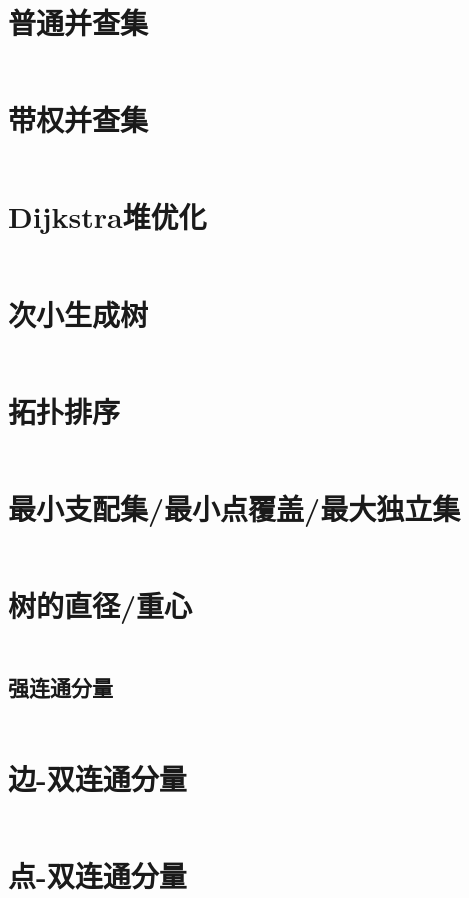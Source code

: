 \documentclass[a4paper,11pt]{article}
\begin{document}
\newpage
\section*{普通并查集}
\inputminted[]{c++}{Template/TreeGraph/UnionSetI.cpp}
\section*{带权并查集}
\inputminted[]{c++}{Template/TreeGraph/UnionSetII.cpp}
\section*{Dijkstra堆优化}
\inputminted[]{c++}{Template/TreeGraph/Dijkstra.cpp}
\section*{次小生成树}
\inputminted[]{c++}{Template/TreeGraph/SST.cpp}
\section*{拓扑排序}
\inputminted[]{c++}{Template/TreeGraph/TopoSort.cpp}
\section*{最小支配集/最小点覆盖/最大独立集}
\inputminted[]{c++}{Template/TreeGraph/SetPro.cpp}
\section*{树的直径/重心}
\inputminted[]{c++}{Template/TreeGraph/TreeDiameter.cpp}
\subsection*{强连通分量}
\inputminted[]{c++}{Template/TreeGraph/Tarjan-SCC.cpp}
\section*{边-双连通分量}
\inputminted[]{c++}{Template/TreeGraph/Tarjan-Edge-BCC.cpp}
\section*{点-双连通分量}
\inputminted[]{c++}{Template/TreeGraph/Tarjan-Vertex-BCC.cpp}
\end{document}
